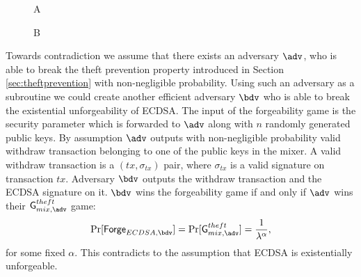 \documentclass[a4paper]{article}
\theoremstyle{definition}
\begin{document}
\begin{appendices}
\begin{wrapfigure}{r}{0.5\textwidth}
\begin{bbrenv}{A}
\begin{bbrbox} [name=\bdv]
			\begin{bbrenv}{B}
				\begin{bbrbox}[name=\adv]
				\end{bbrbox}
				
			\end{bbrenv}
			
		\end{bbrbox}
	\end{bbrenv}
	
\end{wrapfigure}

Towards contradiction we assume that there exists an adversary $\adv$, who is able to break the theft prevention property introduced in Section \ref{sec:theftprevention} with non-negligible probability. Using such an adversary as a subroutine we could create another efficient adversary $\bdv$ who is able to break the existential unforgeability of ECDSA. The input of the forgeability game is the security parameter which is forwarded to $\adv$ along with $n$ randomly generated public keys. By assumption $\adv$ outputs with non-negligible probability valid withdraw transaction belonging to one of the public keys in the mixer. A valid withdraw transaction is a $(tx,\sigma_{tx})$ pair, where $\sigma_{tx}$ is a valid signature on transaction $tx$. Adversary $\bdv$ outputs the withdraw transaction and the ECDSA signature on it. $\bdv$ wins the forgeability game if and only if $\adv$ wins their $\textsf{G}^{theft}_{mix,\adv}$ game:
$$\Pr[\textsf{Forge}_{ECDSA,\bdv}]=\Pr[\textsf{G}^{theft}_{mix, \adv}]=\frac{1}{\lambda^\alpha}, $$ for some fixed $\alpha$. This contradicts to the assumption that ECDSA is existentially unforgeable.
      


\end{appendices}
\end{document}
